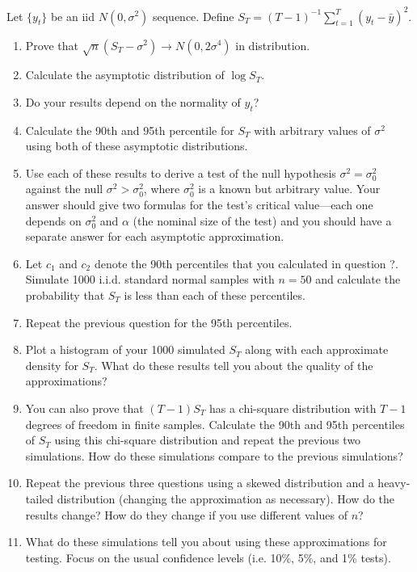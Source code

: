 \begin{hw}
  Let $\{y_t\}$ be an iid $N(0,\sigma^2)$ sequence. Define $S_T =
  (T-1)^{-1} \sum_{t=1}^T (y_t - \bar y)^2$.
  \begin{enumerate}
  \item Prove that $\sqrt{n} (S_T - \sigma^2) \to N(0,2\sigma^4)$ in
    distribution.
  \item Calculate the asymptotic distribution of $\log S_T$.
  \item Do your results depend on the normality of $y_t$?
  \item Calculate the 90th and 95th percentile for $S_T$ with
    arbitrary values of $\sigma^2$ using both of these asymptotic
    distributions.
  \item Use each of these results to derive a test of the null
    hypothesis $\sigma^2 = \sigma_0^2$ against the null $\sigma^2 >
    \sigma_0^2$, where $\sigma_0^2$ is a known but arbitrary value.
    Your answer should give two formulas for the test's critical
    value---each one depends on $\sigma_0^2$ and $\alpha$ (the nominal
    size of the test) and you should have a separate answer for each
    asymptotic approximation.
  \item Let $c_1$ and $c_2$ denote the 90th percentiles that you
    calculated in question ?. Simulate 1000 i.i.d. standard normal
    samples with $n = 50$ and calculate the probability that $S_T$ is
    less than each of these percentiles.
  \item Repeat the previous question for the 95th percentiles.
  \item Plot a histogram of your 1000 simulated $S_T$ along with each
    approximate density for $S_T$. What do these results tell you
    about the quality of the approximations?
  \item You can also prove that $(T-1) S_T$ has a chi-square
    distribution with $T-1$ degrees of freedom in finite samples.
    Calculate the 90th and 95th percentiles of $S_T$ using this
    chi-square distribution and repeat the previous two simulations.
    How do these simulations compare to the previous simulations?
  \item Repeat the previous three questions using a skewed
    distribution and a heavy-tailed distribution (changing the
    approximation as necessary). How do the results change? How do
    they change if you use different values of $n$?
  \item What do these simulations tell you about using these
    approximations for testing. Focus on the usual confidence levels
    (i.e. 10\%, 5\%, and 1\% tests).
  \end{enumerate}
\end{hw}

